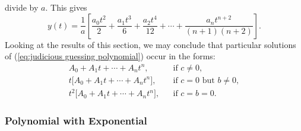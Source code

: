 \documentclass{myart}
\newcommand{\eq}[1]{(\ref{eq:#1})}
\begin{document}
divide by $a$. This gives
\begin{equation*}
  y(t) = \frac{1}{a} \left[\frac{a_0t^2}{2}
       + \frac{a_1t^3}{6}
       + \frac{a_2t^4}{12}
       + \cdots
       + \frac{a_nt^{n+2}}{(n+1)(n+2)}\right].
\end{equation*}
Looking at the results of this section, we may conclude that
particular solutions of \eq{judicious guessing polynomial} occur in
the forms:
\begin{align*}
  A_0 + A_1t + \cdots + A_nt^n,
  && \text{if $c \neq 0$}, \\
  t\Big[A_0 + A_1t + \cdots + A_nt^n\Big],
  && \text{if $c = 0$ but $b \neq 0$}, \\
  t^2\Big[A_0 + A_1t + \cdots + A_nt^n\Big],
  && \text{if $c = b = 0$}.
\end{align*}

\subsubsection{Polynomial with Exponential}
\label{subsubsec:judicious guessing exponential}
\end{document}
